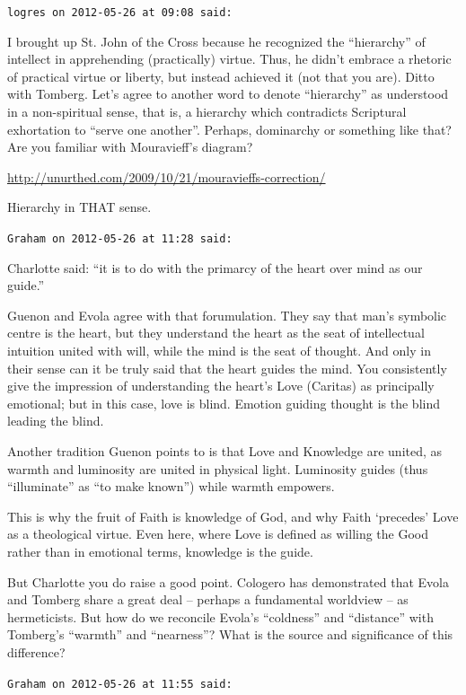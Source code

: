 \begin{footnotesize}
\begin{sffamily}
\hfill

\texttt{logres on 2012-05-26 at 09:08 said:}

I brought up St. John of the Cross because he recognized the ``hierarchy'' of intellect in apprehending (practically) virtue. Thus, he didn't embrace a rhetoric of practical virtue or liberty, but instead achieved it (not that you are). Ditto with Tomberg. Let's agree to another word to denote ``hierarchy'' as understood in a non-spiritual sense, that is, a hierarchy which contradicts Scriptural exhortation to ``serve one another''. Perhaps, dominarchy or something like that? Are you familiar with Mouravieff's diagram?

\url{http://unurthed.com/2009/10/21/mouravieffs-correction/}

Hierarchy in THAT sense.

\hfill

\texttt{Graham on 2012-05-26 at 11:28 said:}

Charlotte said: ``it is to do with the primarcy of the heart over mind as our guide.''

Guenon and Evola agree with that forumulation. They say that man's symbolic centre is the heart, but they understand the heart as the seat of intellectual intuition united with will, while the mind is the seat of thought. And only in their sense can it be truly said that the heart guides the mind. You consistently give the impression of understanding the heart's Love (Caritas) as principally emotional; but in this case, love is blind. Emotion guiding thought is the blind leading the blind.

Another tradition Guenon points to is that Love and Knowledge are united, as warmth and luminosity are united in physical light. Luminosity guides (thus ``illuminate'' as ``to make known'') while warmth empowers.

This is why the fruit of Faith is knowledge of God, and why Faith `precedes' Love as a theological virtue. Even here, where Love is defined as willing the Good rather than in emotional terms, knowledge is the guide.

But Charlotte you do raise a good point. Cologero has demonstrated that Evola and Tomberg share a great deal -- perhaps a fundamental worldview -- as hermeticists. But how do we reconcile Evola's ``coldness'' and ``distance'' with Tomberg's ``warmth'' and ``nearness''? What is the source and significance of this difference?

\hfill

\texttt{Graham on 2012-05-26 at 11:55 said:}


\end{sffamily}
\end{footnotesize}
